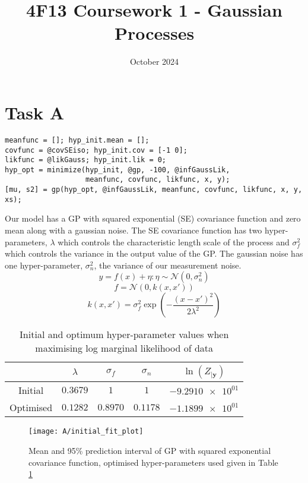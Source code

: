 \documentclass[11pt]{article}
\title{\vspace{-2cm}4F13 Coursework 1 - Gaussian Processes}
\author{}
\date{October 2024}
\begin{document}
\maketitle
\section{Task A}

\begin{lstlisting}[caption=Code to train hyper-parameters and generate the predictive distribution of a GP with squared exponential covariance, captionpos=b, basicstyle=\small]
meanfunc = []; hyp_init.mean = [];
covfunc = @covSEiso; hyp_init.cov = [-1 0];
likfunc = @likGauss; hyp_init.lik = 0;
hyp_opt = minimize(hyp_init, @gp, -100, @infGaussLik, 
                   meanfunc, covfunc, likfunc, x, y);
[mu, s2] = gp(hyp_opt, @infGaussLik, meanfunc, covfunc, likfunc, x, y, xs);
\end{lstlisting}
\label{lst:A}

Our model has a GP with squared exponential (SE) covariance function and zero mean along with a gaussian noise. The SE covariance function has two hyper-parameters, $\lambda$ which controls the characteristic length scale of the process and $\sigma_f^2$ which controls the variance in the output value of the GP. The gaussian noise has one hyper-parameter, $\sigma_n^2$, the variance of our measurement noise. 
\[y = f(x) + \eta : \eta \sim \mathcal{N}(0, \sigma_n^2)\]
\[f = \mathcal{N}(0, k(x, x'))\]
\[k(x,x') = \sigma_f^2 \exp(-\frac{(x-x')^2}{2\lambda^2})\]

\begin{table}[h]
    \centering
    \begin{tabular}{|c|c|c|c|c|}
        \hline
         & $\lambda$ & $\sigma_f$ & $\sigma_n$ & $\ln(Z_{|\textbf{y}})$ \\
        \hline
        Initial & $0.3679$ & $1$ & $1$ & $\num{-9.2910e+01}$ \\ 
        Optimised & $0.1282$ & $0.8970$ & $0.1178$ & $\num{-1.1899e+01}$ \\ 
        \hline
    \end{tabular}
    \caption{Initial and optimum hyper-parameter values when maximising log marginal likelihood of data}
    \label{table:A_hyper_parameters}
\end{table}

\begin{figure}[h]
    \centering
    \texttt{[image: A/initial\_fit\_plot]}
    \caption{Mean and 95\% prediction interval of GP with squared exponential covariance function, optimised hyper-parameters used given in Table \ref{table:A_hyper_parameters}}
    \label{fig:A}
\end{figure}
\end{document}
